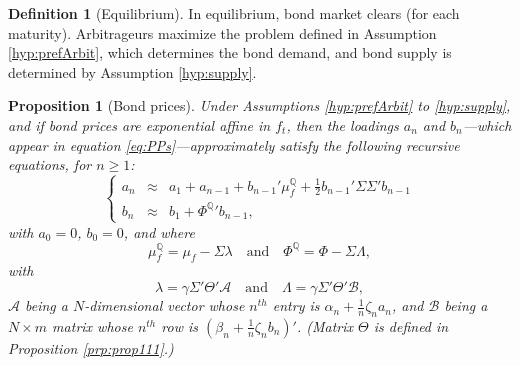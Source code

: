 \documentclass[
  12pt,
]{book}
\newtheorem{proposition}{Proposition}[chapter]
\theoremstyle{definition}
\newtheorem{definition}{Definition}[chapter]
\theoremstyle{definition}
\theoremstyle{definition}
\theoremstyle{definition}
\theoremstyle{remark}
\begin{document}
\begin{definition}[Equilibrium]
\protect\hypertarget{def:Equilib}{}\label{def:Equilib}In equilibrium, bond market clears (for each maturity). Arbitrageurs maximize the problem defined in Assumption \ref{hyp:prefArbit}, which determines the bond demand, and bond supply is determined by Assumption \ref{hyp:supply}.
\end{definition}

\begin{proposition}[Bond prices]
\protect\hypertarget{prp:PropII}{}\label{prp:PropII}Under Assumptions \ref{hyp:prefArbit} to \ref{hyp:supply}, and if bond prices are exponential affine in \(f_t\), then the loadings \(a_n\) and \(b_n\)---which appear in equation \eqref{eq:PPs}---approximately satisfy the following recursive equations, for \(n\ge 1\):
\begin{equation}
\left\{
\begin{array}{cll}
a_n &\approx& a_1 + a_{n-1} + b_{n-1}'\mu_f^{\mathbb{Q}} + \frac{1}{2}b_{n-1}'\Sigma \Sigma'b_{n-1} \\
b_n &\approx& b_1 + {\Phi^{\mathbb{Q}}}'b_{n-1},
\end{array}
\right.\label{eq:recursConventio}
\end{equation}
with \(a_0=0\), \(b_0=0\), and where
\begin{equation}
\mu_f^{\mathbb{Q}} = \mu_f - \Sigma \lambda \quad \mbox{and} \quad \Phi^{\mathbb{Q}} = \Phi - \Sigma \Lambda,\label{eq:muPHIQ}
\end{equation}
with
\begin{equation}
\lambda = \gamma \Sigma' \Theta'\mathcal{A} \quad \mbox{and} \quad \Lambda = \gamma \Sigma' \Theta'\mathcal{B},\label{eq:lambdas} 
\end{equation}
\(\mathcal{A}\) being a \(N\)-dimensional vector whose \(n^{th}\) entry is \(\alpha_n + \frac{1}{n}\zeta_n a_n\), and \(\mathcal{B}\) being a \(N \times m\) matrix whose \(n^{th}\) row is \((\beta_n + \frac{1}{n}\zeta_n b_n)'\). (Matrix \(\Theta\) is defined in Proposition \ref{prp:prop111}.)
\end{proposition}
\end{document}
